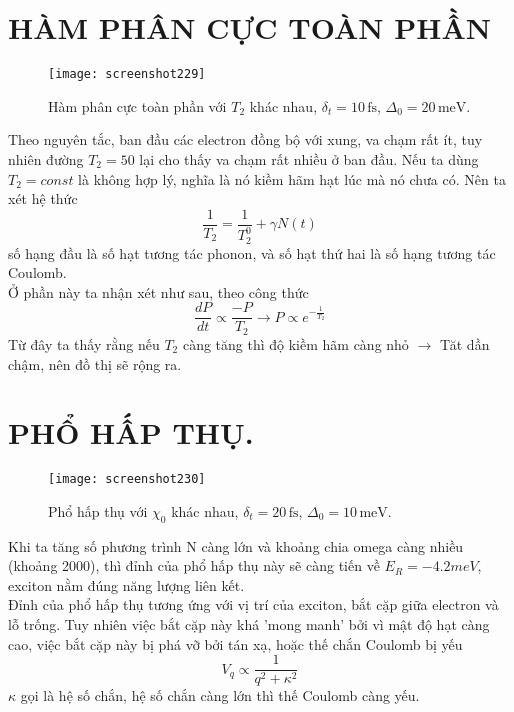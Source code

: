 \documentclass[16Pt]{article}
\begin{document}
	\newpage
	\section*{HÀM PHÂN CỰC TOÀN PHẦN}
	\begin{figure}[h!]
		\centering
		\texttt{[image: screenshot229]}
		\caption{Hàm phân cực toàn phần với $T_2$ khác nhau, $\delta_t = 10 \, \text{fs}$, $\Delta_0 = 20 \, \text{meV}$.}
		\label{fig:screenshot229}
	\end{figure}
	
	Theo nguyên tắc, ban đầu các electron đồng bộ với xung, va chạm rất ít, tuy nhiên đường $T_2 = 50$ lại cho thấy va chạm rất nhiều ở ban đầu. Nếu ta dùng $T_2=const$ là không hợp lý, nghĩa là nó kiềm hãm hạt lúc mà nó chưa có. Nên ta xét hệ thức
	\[
	\frac{1}{T_2} = \frac{1}{T_2^0} + \gamma N(t)
	\]
	số hạng đầu là số hạt tương tác phonon, và số hạt thứ hai là số hạng tương tác Coulomb.\\
	Ở phần này ta nhận xét như sau, theo công thức 
	\[
	\frac{dP}{dt} \propto \frac{-P}{T_2} \rightarrow P \propto e^{-\frac{1}{T_2}}
	\]
	Từ đây ta thấy rằng nếu $T_2$ càng tăng thì độ kiềm hãm càng nhỏ $\rightarrow$ Tăt dần chậm, nên đồ thị sẽ rộng ra. \\
	
	\newpage
	\section*{PHỔ HẤP THỤ.}
	\begin{figure}[h!]
		\centering
		\texttt{[image: screenshot230]}
		\caption{Phổ hấp thụ với $\chi_0$ khác nhau, $\delta_t = 20 \, \text{fs}$, $\Delta_0 = 10 \, \text{meV}$.}
		\label{fig:screenshot230}
	\end{figure}
	Khi ta tăng số phương trình N càng lớn và khoảng chia omega càng nhiều (khoảng 2000), thì đỉnh của phổ hấp thụ này sẽ càng tiến về $E_R = -4.2 meV$, exciton nằm đúng năng lượng liên kết.\\
	Đỉnh của phổ hấp thụ tương ứng với vị trí của exciton, bắt cặp giữa electron và lỗ trống. Tuy nhiên việc bắt cặp này khá 'mong manh' bởi vì mật độ hạt càng cao, việc bắt cặp này bị phá vỡ bởi tán xạ, hoặc thế chắn Coulomb bị yếu 
	\[
	V_q \propto \frac{1}{q^2 + \kappa^2}
	\]
	$\kappa$ gọi là hệ số chắn, hệ số chắn càng lớn thì thế Coulomb càng yếu.
	
	
\end{document}
